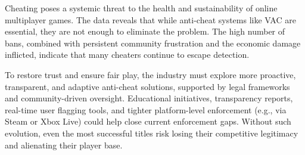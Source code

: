 Cheating poses a systemic threat to the health and sustainability of online multiplayer games. The data reveals that while anti-cheat systems like VAC are essential, they are not enough to eliminate the problem. The high number of bans, combined with persistent community frustration and the economic damage inflicted, indicate that many cheaters continue to escape detection.

To restore trust and ensure fair play, the industry must explore more proactive, transparent, and adaptive anti-cheat solutions, supported by legal frameworks and community-driven oversight. Educational initiatives, transparency reports, real-time user flagging tools, and tighter platform-level enforcement (e.g., via Steam or Xbox Live) could help close current enforcement gaps. Without such evolution, even the most successful titles risk losing their competitive legitimacy and alienating their player base.

